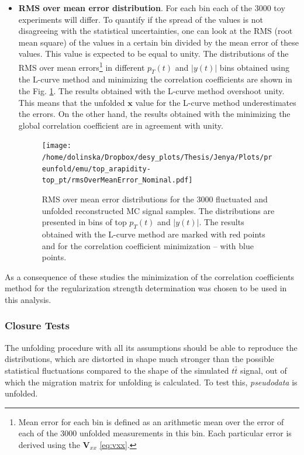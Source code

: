 \begin{itemize}
 \item \textbf{RMS over mean error distribution}. For each bin  each of the 3000 toy experiments will differ. To quantify if the spread of 
 the values is not disagreeing with the statistical uncertainties, one can look at the 
 RMS (root mean square) of the values in a certain bin divided by the mean error of these values. This value is expected to be equal to unity.
 The distributions of the RMS over mean errors\footnote{Mean error for each bin is defined as an arithmetic mean over the error of each of the 3000 
 unfolded measurements in this bin. Each particular error is derived using the $\mathbf{V}_{xx}$ \ref{eq:vxx}.} in different $p_{T}(t)$ 
 and $|y(t)|$ bins obtained using the L-curve method and minimizing the 
 correlation coefficients are shown in the Fig. \ref{fig:RMSovMeanErr}. The results obtained with the L-curve method
 overshoot unity. This means that the unfolded $\mathbf{x}$ value for the L-curve method underestimates the errors. On the other hand, 
 the results obtained with the minimizing the global correlation coefficient are in agreement with unity.
 \begin{figure}[t]
  \centering
  \texttt{[image: /home/dolinska/Dropbox/desy\_plots/Thesis/Jenya/Plots/preunfold/emu/top\_arapidity-top\_pt/rmsOverMeanError\_Nominal.pdf]}
  \caption{RMS over mean error distributions for the 3000 fluctuated and unfolded reconstructed MC signal samples. The distributions are
         presented in bins of top $p_{T}(t)$ and $|y(t)|$. The results obtained with the L-curve method are marked with red points and 
         for the correlation coefficient minimization -- with blue points.}
  \label{fig:RMSovMeanErr}
 \end{figure}

\end{itemize}

As a consequence of these studies the minimization of the correlation coefficients method for the regularization strength determination was chosen
to be used in this analysis.

\subsubsection{Closure Tests}

The unfolding procedure with all its assumptions should be able to reproduce the distributions, which are distorted in shape much stronger
than the possible statistical fluctuations compared to the shape of the simulated $t\bar{t}$ signal, out of which the migration matrix for unfolding
is calculated. To test this, \textit{pseudodata} is unfolded.

